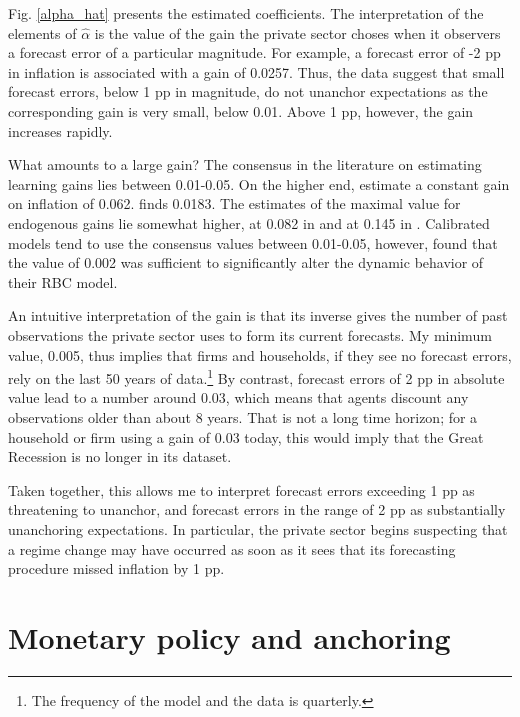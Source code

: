 \documentclass[11pt]{article}
\renewcommand{\[}{\begin{equation}}
\renewcommand{\]}{\end{equation}}
\def\ppFEunanchors{1 }
\begin{document}
Fig. \ref{alpha_hat} presents the estimated coefficients. The interpretation of the elements of $\hat{\alpha}$ is the value of the gain the private sector choses when it observers a forecast error of a particular magnitude. For example, a forecast error of -2 pp in inflation is associated with a gain of 0.0257. Thus, the data suggest that small forecast errors, below \ppFEunanchors pp in magnitude, do not unanchor expectations as the corresponding gain is very small, below 0.01. Above \ppFEunanchors pp, however, the gain increases rapidly.

What amounts to a large gain? The consensus in the literature on estimating learning gains lies between 0.01-0.05. On the higher end, \cite{branch2006simple} estimate a constant gain on inflation of 0.062. \cite{milani2007expectations} finds 0.0183. The estimates of the maximal value for endogenous gains lie somewhat higher, at 0.082 in \cite{milani2014learning} and at 0.145 in \cite{carvalho2019anchored}. Calibrated models tend to use the consensus values between 0.01-0.05, however, \cite{eusepi2011expectations} found that the value of 0.002 was sufficient to significantly alter the dynamic behavior of their RBC model. 

An intuitive interpretation of the gain is that its inverse gives the number of past observations the private sector uses to form its current forecasts. My minimum value, 0.005, thus implies that firms and households, if they see no forecast errors, rely on the last 50 years of data.\footnote{The frequency of the model and the data is quarterly.} By contrast, forecast errors of 2 pp in absolute value lead to a number around 0.03, which means that agents discount any observations older than about 8 years. That is not a long time horizon; for a household or firm using a gain of 0.03 today, this would imply that the Great Recession is no longer in its dataset.

Taken together, this allows me to interpret forecast errors exceeding \ppFEunanchors pp as threatening to unanchor, and forecast errors in the range of 2 pp as substantially unanchoring expectations. In particular, the private sector begins suspecting that a regime change may have occurred as soon as it sees that its forecasting procedure missed inflation by \ppFEunanchors pp.  


\section{Monetary policy and anchoring}\label{analytical}
\end{document}
